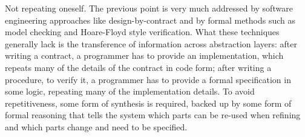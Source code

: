 \begin{paragraph}{Not repeating oneself.}
The previous point is very much addressed by software engineering approaches
like design-by-contract and by formal methods such as model checking and Hoare-Floyd
style verification.
What these techniques generally lack is the transference of information across
abstraction layers:
after writing a contract, a programmer has to provide an implementation,
which repeats many of the details of the contract in code form;
after writing a procedure, to verify it, a programmer has to provide a formal
specification in some logic, repeating many of the implementation details.
To avoid repetitiveness, some form of synthesis is required, backed up by some
form of formal reasoning that tells the system which parts can be re-used when
refining and which parts change and need to be specified.
\end{paragraph}

